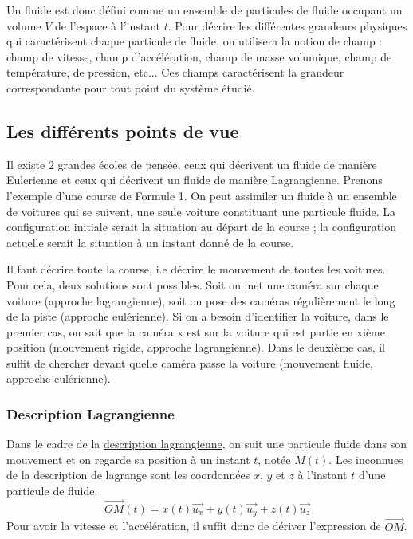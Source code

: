 \documentclass[a4paper,10pt]{report}
\begin{document}
Un fluide est donc défini comme un ensemble de particules de fluide occupant un volume $V$ de l'espace à l'instant $t$. Pour décrire les différentes grandeurs physiques qui caractérisent chaque particule de fluide, on utilisera la notion de champ : champ de vitesse, champ d'accélération, champ de masse volumique, champ de température, de pression, etc... Ces champs caractérisent la grandeur correspondante pour tout point du système étudié.

\subsection{Les différents points de vue}
Il existe 2 grandes écoles de pensée, ceux qui décrivent un fluide de manière Eulerienne et ceux qui décrivent un fluide de manière Lagrangienne. Prenons l'exemple d'une course de Formule 1. On peut assimiler un fluide à un ensemble de voitures qui se suivent, une seule voiture constituant une particule fluide. La configuration initiale serait la situation au départ de la course ; la configuration actuelle serait la situation à un instant donné de la course.

Il faut décrire toute la course, i.e décrire le mouvement de toutes les voitures. Pour cela, deux solutions sont possibles. Soit on met une caméra sur chaque voiture (approche lagrangienne), soit on pose des caméras régulièrement le long de la piste (approche eulérienne). Si on a besoin d’identifier la voiture, dans le premier cas, on sait que la caméra x est sur la voiture qui est partie en xième position (mouvement rigide, approche lagrangienne). Dans le deuxième cas, il suffit de chercher devant quelle caméra passe la voiture (mouvement fluide, approche eulérienne).

\subsubsection{Description Lagrangienne}
Dans le cadre de la \href{https://fr.wikipedia.org/wiki/Description_lagrangienne}{description lagrangienne}, on suit une particule fluide dans son mouvement et on regarde sa position à un instant $t$, notée $M(t)$. Les inconnues de la description de lagrange sont les coordonnées $x$, $y$ et $z$ à l'instant $t$ d'une particule de fluide.
$$\vec{OM}(t) = x(t)\vec{u_x} + y(t)\vec{u_y} + z(t)\vec{u_z}$$
Pour avoir la vitesse et l'accélération, il suffit donc de dériver l'expression de $\vec{OM}$.
\end{document}
